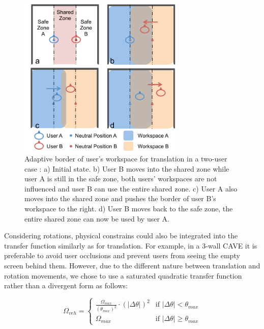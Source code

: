 \begin{figure}[htb]
\begin{center}
\includegraphics[width=0.7\textwidth]{figures/ch4/adaptive_trans_border}
\end{center}
\caption{\label{fig:4_adaptive_trans_border}Adaptive border of user's workspace for translation in a two-user case : a) Initial state. b) User B moves into the shared zone while user A is still in the safe zone, both users' workspaces are not influenced and user B can use the entire shared zone. c) User A also moves into the shared zone and pushes the border of user B's workspace to the right. d) User B moves back to the safe zone, the entire shared zone can now be used by user A.}
\end{figure}

Considering rotations, physical constrains could also be integrated into the transfer function similarly as for translation. For example, in a 3-wall CAVE it is preferable to avoid user occlusions and prevent users from seeing the empty screen behind them. However, due to the different nature between translation and rotation movements, we chose to use a saturated quadratic transfer function rather than a divergent form as follows:

\begin{equation}
\Omega_{veh}=
  \begin{cases}
    \frac{\Omega_{max}}{(\theta_{max})^{2}}\cdot(|\Delta\theta|)^{2} & \text{if } |\Delta\theta|<\theta_{max} \\
    \Omega_{max} & \text{if } |\Delta\theta| \geq \theta_{max}
  \end{cases}
\end{equation}

